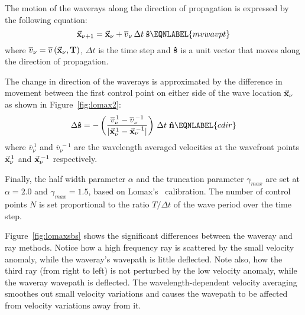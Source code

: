 The motion of the waverays along the direction of propagation 
is expressed by the following equation:
%
\begin{equation}
 \vec{\bf x}_{\nu+1} = \vec{\bf x}_{\nu} + 
 \overline{v}_{\nu}\, \Delta t\; {\bf \hat{s}}
\EQNLABEL{mvwavpt}
\end{equation}
%
where \( \overline{v}_{\nu} = \overline{v}\, (\vec{\bf x}_{\nu},{\bf T\/}) \),
$\Delta t$ is the time step and ${\bf \hat{s}}$ is a unit vector
that moves along the direction of propagation.


The change in direction of the waverays is approximated by the 
difference in movement between the first control point on either
side of the wave location \( \vec{\bf x}_{\nu} \) as shown in
Figure~\ref{fig:lomax2}:
%
\begin{equation}
 \Delta {\bf \hat{s}} = - \left( \frac{
    \overline{v}_{\nu}^{\, 1} - \overline{v}_{\nu}^{\, -1}}
    {| \vec{\bf x}_{\nu}^{\, 1} - \vec{\bf x}_{\nu}^{\, -1} |} \right) \,
 \Delta t \; {\bf \hat{n}}
\EQNLABEL{cdir}
\end{equation}
%
where \( \overline{v}_{\nu}^{\, 1} \) and \( \overline{v}_{\nu}^{\, -1} \)
are the wavelength averaged velocities at the wavefront points
\( \vec{\bf x}_{\nu}^{\, 1} \) and \( \vec{\bf x}_{\nu}^{\, -1} \)
respectively.

Finally, the half width parameter $\alpha$ and the truncation 
parameter $\gamma_{max}$ are set at $\alpha = 2.0$
and $\gamma_{max} = 1.5$, based on Lomax's~
calibration. The number of control points $N$ is set 
proportional to the ratio $T/\Delta t$ of the wave period over the 
time step. 

Figure~\ref{fig:lomaxsbs} shows the significant differences between
the waveray and ray methods. Notice how a high frequency ray
is scattered by the small velocity anomaly,
while the waveray's wavepath is little deflected. Note also, how the
third ray (from right to left) is not perturbed by the low velocity
anomaly, while the waveray wavepath is deflected.
The wavelength-dependent velocity averaging smoothes out
small velocity variations and causes the wavepath to be affected
from velocity variations away from it.



